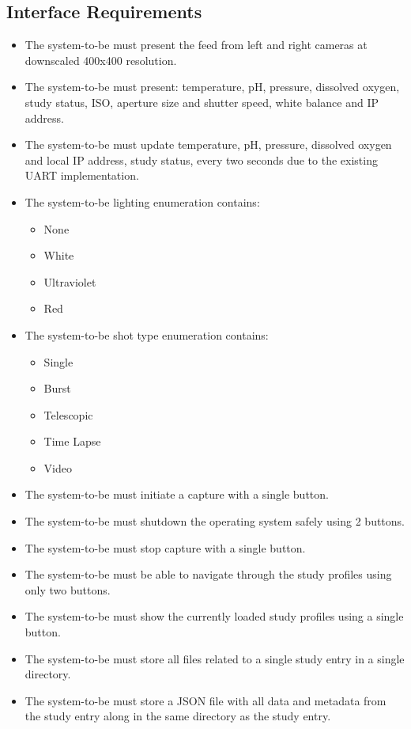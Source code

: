 \subsection{Interface Requirements}
\begin{itemize}
	\item The system-to-be must present the feed from left and right cameras at downscaled 400x400 resolution.
	\item The system-to-be must present: temperature, pH, pressure, dissolved oxygen, study status, ISO, aperture size and shutter speed, white balance and IP address.
	\item The system-to-be must update temperature, pH, pressure, dissolved oxygen and local IP address, study status, every two seconds due to the existing UART implementation.
	\item The system-to-be lighting enumeration contains:
	      \begin{itemize}
		      \item None
		      \item White
		      \item Ultraviolet
		      \item Red
	      \end{itemize}
	\item The system-to-be shot type enumeration contains:
	      \begin{itemize}
		      \item Single
		      \item Burst
		      \item Telescopic
		      \item Time Lapse
		      \item Video
	      \end{itemize}
	\item The system-to-be must initiate a capture with a single button.
	\item The system-to-be must shutdown the operating system safely using 2 buttons.
	\item The system-to-be must stop capture with a single button.
	\item The system-to-be must be able to navigate through the study profiles using only two buttons.
	\item The system-to-be must show the currently loaded study profiles using a single button.
	\item The system-to-be must store all files related to a single study entry in a single directory.
	\item The system-to-be must store a JSON file with all data and metadata from the study entry along in the same directory as the study entry.

\end{itemize}
